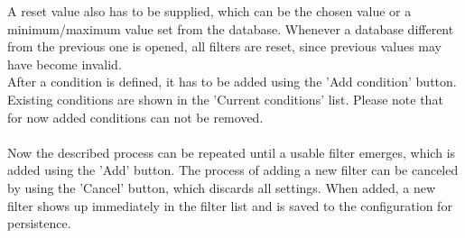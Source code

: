 A reset value also has to be supplied, which can be the chosen value or a minimum/maximum value set from the database.  Whenever a database different from the previous one is opened, all filters are reset, since previous values may have become invalid.\\

After a condition is defined, it has to be added using the 'Add condition' button. Existing conditions are shown in the 'Current conditions' list. Please note that for now added conditions can not be removed. \\\\

Now the described process can be repeated until a usable filter emerges, which is added using the 'Add'
button. The process of adding a new filter can be canceled by using the 'Cancel' button, which discards all
settings. When added, a new filter shows up immediately in the filter list and is saved to the configuration
for persistence.

% 
% 
 
